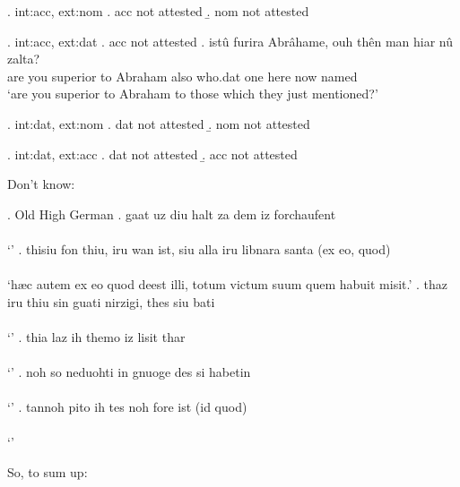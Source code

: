 \ex. \ac{int}:\ac{acc}, \ac{ext}:\ac{nom}
\a. \ac{acc} not attested
\b. \ac{nom} not attested

\ex. \ac{int}:\ac{acc}, \ac{ext}:\ac{dat}
\a. \ac{acc} not attested
\bg. istû furira Abrâhame, ouh thên man hiar nû zalta?\\
 {are you} superior\scsub{[dat]} {to Abraham} also who.\ac{dat} one here now named\scsub{[acc]}\\
 `are you superior to Abraham to those which they just mentioned?' 

\ex. \ac{int}:\ac{dat}, \ac{ext}:\ac{nom}
\a. \ac{dat} not attested
\b. \ac{nom} not attested

\ex. \ac{int}:\ac{dat}, \ac{ext}:\ac{acc}
\a. \ac{dat} not attested
\b. \ac{acc} not attested





Don't know:

\ex. Old High German
\ag. gaat uz diu halt za dem iz forchaufent\\
 \\
 `' 
\bg. thisiu fon thiu, iru wan ist, siu alla iru libnara santa (ex eo, quod)\\
 \\
 `hæc autem ex eo quod deest illi, totum victum suum quem habuit misit.' 
\bg. thaz iru thiu sin guati nirzigi, thes siu bati\\
 \\
 `' 
\bg. thia laz ih themo iz lisit thar\\
 \\
 `' 
\bg. noh so neduohti in gnuoge des si habetin\\
 \\
 `' 
\bg. tannoh pito ih tes noh fore ist (id quod)\\
 \\
 `' 

So, to sum up:



